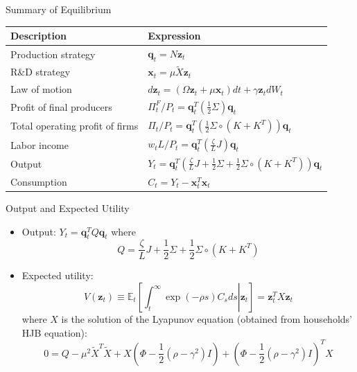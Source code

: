 \documentclass[english,aspectratio=169,handout]{beamer}
\theoremstyle{plain}
\begin{document}
\begin{frame}{Summary of Equilibrium}
  \begin{center}
    \label{summary}%
    \begin{tabular}{ll}
      Description                     & Expression\tabularnewline
      \hline
      Production strategy             & $\mathbf{q}_{t}=N\mathbf{z}_{t}$\tabularnewline
      R\&D strategy                   & $\mathbf{x}_{t}=\mu\tilde{X}\mathbf{z}_{t}$\tabularnewline
      Law of motion                   & $d\mathbf{z}_{t}=\left(\Omega\mathbf{z}_{t}+\mu\mathbf{x}_{t}\right)dt+\gamma\mathbf{z}_{t}dW_{t}$\tabularnewline
      Profit of final producers       & $\Pi_{t}^{F}/P_{t}=\mathbf{q}_{t}^{T}\left(\frac{1}{2}\Sigma\right)\mathbf{q}_{t}$\tabularnewline
      Total operating profit of firms & $\Pi_{t}/P_{t}=\mathbf{q}_{t}^{T}\left(\frac{1}{2}\Sigma\circ\left(K+K^{T}\right)\right)\mathbf{q}_{t}$\tabularnewline
      Labor income                    & $w_{t}L/P_{t}=\mathbf{q}_{t}^{T}\left(\frac{\zeta}{L}J\right)\mathbf{q}_{t}$\tabularnewline
      Output                          & $Y_{t}=\mathbf{q}_{t}^{T}\left(\frac{\zeta}{L}J+\frac{1}{2}\Sigma+\frac{1}{2}\Sigma\circ\left(K+K^{T}\right)\right)\mathbf{q}_{t}$\tabularnewline
      Consumption                     & $C_{t}=Y_{t}-\mathbf{x}_{t}^{T}\mathbf{x}_{t}$\tabularnewline
    \end{tabular}
    \par\end{center}

  \hyperlink{aggregation}{}
\end{frame}
%
\begin{frame}{Output and Expected Utility }

  \label{X}
  \begin{itemize}
    \item Output: $Y_{t}=\mathbf{q}_{t}^{T}Q\mathbf{q}_{t}$ where
          \[
            Q=\frac{\zeta}{L}J+\frac{1}{2}\Sigma+\frac{1}{2}\Sigma\circ\left(K+K^{T}\right)
          \]
    \item Expected utility:
          \[
            V\left(\mathbf{z}_{t}\right)\equiv\mathbb{E}_{t}\left[\left.\int_{t}^{\infty}\exp\left(-\rho s\right)C_{s}ds\right|\mathbf{z}_{t}\right]=\mathbf{z}_{t}^{T}X\mathbf{z}_{t}
          \]
          where $X$ is the solution of the Lyapunov equation (obtained from
          households' HJB equation):
          \[
            0=Q-\mu^{2}\tilde{X}^{T}\tilde{X}+X\left(\Phi-\frac{1}{2}\left(\rho-\gamma^{2}\right)I\right)+\left(\Phi-\frac{1}{2}\left(\rho-\gamma^{2}\right)I\right)^{T}X
          \]
  \end{itemize}
  \hyperlink{aggregation}{}
\end{frame}
\end{document}
